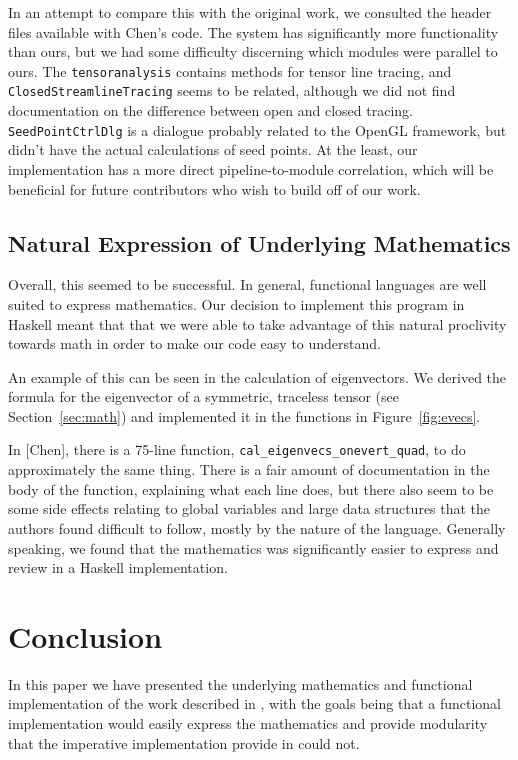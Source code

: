 \documentclass[twocolumn]{article}
\begin{document}
In an attempt to compare this with the original work, we consulted the header
files available with Chen’s code. The system has significantly more
functionality than ours, but we had some difficulty discerning which modules
were parallel to ours. The \texttt{tensoranalysis} contains methods for tensor
line tracing, and \texttt{ClosedStreamlineTracing} seems to be related,
although we did not find documentation on the difference between open and
closed tracing. \texttt{SeedPointCtrlDlg} is a dialogue probably related to the
OpenGL framework, but didn’t have the actual calculations of seed points. At
the least, our implementation has a more direct pipeline-to-module correlation,
which will be beneficial for future contributors who wish to build off of our
work.

\subsection{Natural Expression of Underlying Mathematics}
Overall, this seemed to be successful. In general, functional languages are
well suited to express mathematics. Our decision to implement this program in
Haskell meant that that we were able to take advantage of this natural
proclivity towards math in order to make our code easy to understand.

An example of this can be seen in the calculation of eigenvectors. We derived
the formula for the eigenvector of a symmetric, traceless tensor
(see Section~\ref{sec:math}) and implemented it in the functions in
Figure~\ref{fig:evecs}.

In [Chen], there is a 75-line function,
\texttt{cal\_eigenvecs\_onevert\_quad}, to do approximately the same thing. There
is a fair amount of documentation in the body of the function, explaining what
each line does, but there also seem to be some side effects relating to global
variables and large data structures that the authors found difficult to follow,
mostly by the nature of the language.  Generally speaking, we found that the
mathematics was significantly easier to express and review in a Haskell
implementation.

\section{Conclusion}
In this paper we have presented the underlying mathematics and functional
implementation of the work described in \cite{chen}, with the goals being that a
functional implementation would easily express the mathematics and provide
modularity that the imperative implementation provide in \cite{chen} could not.




\end{document}
